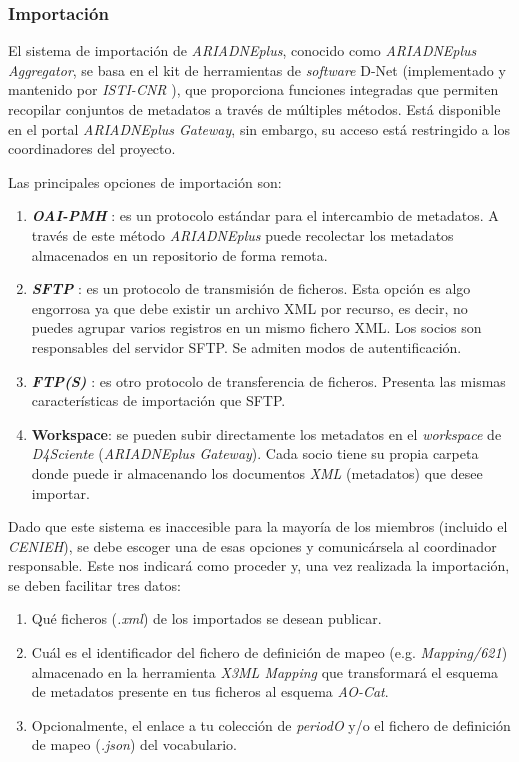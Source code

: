 \subsubsection{Importación}

El sistema de importación de \emph{ARIADNEplus}, conocido como \emph{ARIADNEplus}
\emph{Aggregator}, se basa en el kit de herramientas de \emph{software}
D-Net (implementado y mantenido por \emph{ISTI-CNR} \cite{isti:web}), 
que proporciona funciones integradas que permiten recopilar conjuntos 
de metadatos a través de múltiples métodos. Está disponible en el portal 
\emph{ARIADNEplus Gateway}, sin embargo, su acceso está restringido a los 
coordinadores del proyecto. 

Las principales opciones de importación son:

\begin{enumerate}
\def\labelenumi{\arabic{enumi}.}
\tightlist
\item
  \textbf{\emph{OAI-PMH}} \cite{oai:web}: es un protocolo estándar para el intercambio de
  metadatos. A través de este método \emph{ARIADNEplus} puede recolectar los
  metadatos almacenados en un repositorio de forma remota.
\item
  \textbf{\emph{SFTP}} \cite{wiki:sftp} : es un protocolo de transmisión de ficheros. Esta opción
  es algo engorrosa ya que debe existir un archivo XML por recurso, es
  decir, no puedes agrupar varios registros en un mismo fichero XML. Los
  socios son responsables del servidor SFTP. Se admiten modos de
  autentificación.
\item
  \textbf{\emph{FTP(S)}} \cite{wiki:ftp}: es otro protocolo de transferencia de ficheros.
  Presenta las mismas características de importación que SFTP.
\item
  \textbf{Workspace}: se pueden subir directamente los metadatos en el
  \emph{workspace} de \emph{D4Sciente} (\emph{ARIADNEplus Gateway}). Cada socio tiene
  su propia carpeta donde puede ir almacenando los documentos \emph{XML}
  (metadatos) que desee importar.
\end{enumerate}

Dado que este sistema es inaccesible para la mayoría de los miembros
(incluido el \emph{CENIEH}), se debe escoger una de esas opciones y
comunicársela al coordinador responsable. Este nos indicará como proceder y,
una vez realizada la importación, se deben facilitar tres datos:

\begin{enumerate}
\tightlist
\item
  Qué ficheros (\emph{.xml}) de los importados se desean publicar.
\item
  Cuál es el identificador del fichero de definición de mapeo (e.g.
  \emph{Mapping/621}) almacenado en la herramienta \emph{X3ML Mapping} que 
  transformará el esquema de metadatos presente en tus ficheros al esquema \emph{AO-Cat}.
\item
  Opcionalmente, el enlace a tu colección de \emph{periodO} y/o el fichero de definición de
  mapeo (\emph{.json}) del vocabulario.
\end{enumerate}

